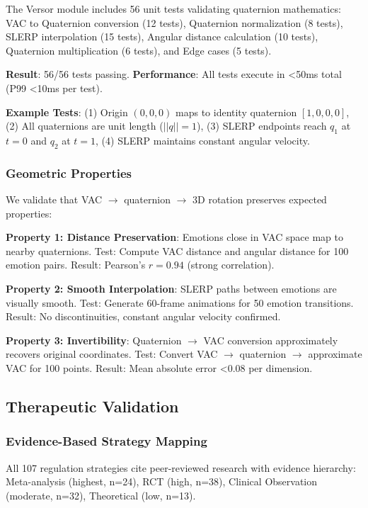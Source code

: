 The Versor module includes 56 unit tests validating quaternion mathematics: VAC to Quaternion conversion (12 tests), Quaternion normalization (8 tests), SLERP interpolation (15 tests), Angular distance calculation (10 tests), Quaternion multiplication (6 tests), and Edge cases (5 tests).

\textbf{Result}: 56/56 tests passing. \textbf{Performance}: All tests execute in <50ms total (P99 <10ms per test).

\textbf{Example Tests}: (1) Origin $(0,0,0)$ maps to identity quaternion $[1, 0, 0, 0]$, (2) All quaternions are unit length ($||q|| = 1$), (3) SLERP endpoints reach $q_1$ at $t=0$ and $q_2$ at $t=1$, (4) SLERP maintains constant angular velocity.

\subsubsection{Geometric Properties}

We validate that VAC $\rightarrow$ quaternion $\rightarrow$ 3D rotation preserves expected properties:

\textbf{Property 1: Distance Preservation}: Emotions close in VAC space map to nearby quaternions. Test: Compute VAC distance and angular distance for 100 emotion pairs. Result: Pearson's $r = 0.94$ (strong correlation).

\textbf{Property 2: Smooth Interpolation}: SLERP paths between emotions are visually smooth. Test: Generate 60-frame animations for 50 emotion transitions. Result: No discontinuities, constant angular velocity confirmed.

\textbf{Property 3: Invertibility}: Quaternion $\rightarrow$ VAC conversion approximately recovers original coordinates. Test: Convert VAC $\rightarrow$ quaternion $\rightarrow$ approximate VAC for 100 points. Result: Mean absolute error <0.08 per dimension.

\subsection{Therapeutic Validation}

\subsubsection{Evidence-Based Strategy Mapping}

All 107 regulation strategies cite peer-reviewed research with evidence hierarchy: Meta-analysis (highest, n=24), RCT (high, n=38), Clinical Observation (moderate, n=32), Theoretical (low, n=13).

